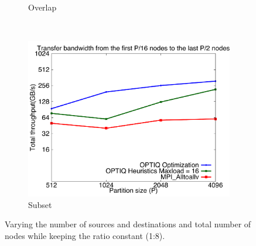 \begin{figure}[!htbp]
\begin{subfigure}[b]{0.32\textwidth}
                \caption{Overlap}
                \label{fig:constantr_27}
        \end{subfigure}
        ~ %
        \begin{subfigure}[b]{0.32\textwidth}
                \includegraphics[width=\textwidth]{figures/constantr_87}
                \caption{Subset}
                \label{fig:constantr_87}
        \end{subfigure}
        \caption{Varying the number of sources and destinations and total number of nodes while keeping the ratio constant (1:8).}
	\vspace{-0.15in}
        \label{fig:constantr}
\end{figure}


